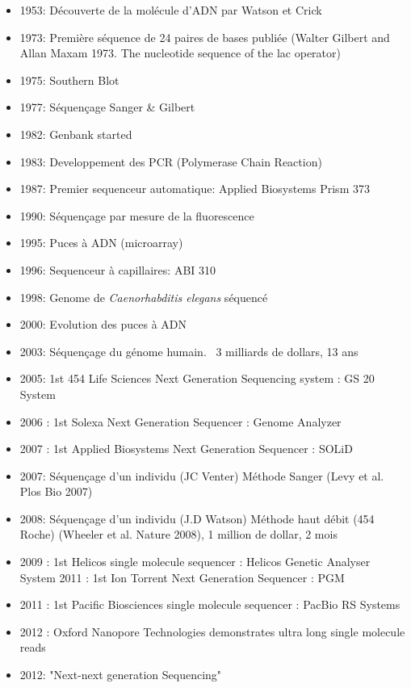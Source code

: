 \documentclass[a4paper]{article}
\begin{document}
\begin{itemize}
\item 1953: Découverte de la molécule d'ADN par Watson et Crick
\item 1973: Première séquence de 24 paires de bases publiée (Walter Gilbert and Allan Maxam 1973. The nucleotide sequence of the lac operator)
\item 1975: Southern Blot
\item 1977: Séquençage Sanger & Gilbert
\item 1982: Genbank started
\item 1983: Developpement des PCR (Polymerase Chain Reaction)
\item 1987: Premier sequenceur automatique: Applied Biosystems Prism 373
\item 1990: Séquençage par mesure de la fluorescence
\item 1995: Puces à ADN (microarray)
\item 1996: Sequenceur à capillaires: ABI 310
\item 1998: Genome de \textit{Caenorhabditis elegans} séquencé
\item 2000: Evolution des puces à ADN
\item 2003: Séquençage du génome humain. ~3 milliards de dollars, 13 ans 
\item 2005: 1st 454 Life Sciences Next Generation Sequencing system : GS 20 System
\item 2006 : 1st Solexa Next Generation Sequencer : Genome Analyzer
\item 2007 : 1st Applied Biosystems Next Generation Sequencer : SOLiD
\item 2007: Séquençage d'un individu (JC Venter) Méthode Sanger (Levy et al. Plos Bio 2007)
\item 2008: Séquençage d'un individu (J.D Watson) Méthode haut débit (454 Roche) (Wheeler et al. Nature 2008), 1 million de dollar, 2 mois
\item 2009 : 1st Helicos single molecule sequencer : Helicos Genetic Analyser System 2011 : 1st Ion Torrent Next Generation Sequencer : PGM
\item 2011 : 1st Pacific Biosciences single molecule sequencer : PacBio RS Systems
\item 2012 : Oxford Nanopore Technologies demonstrates ultra long single molecule reads
\item 2012: "Next-next generation Sequencing"
\end{itemize}
\end{document}
